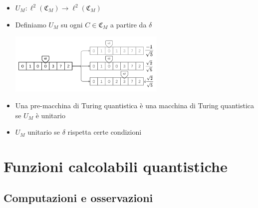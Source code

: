 \documentclass{beamer}
\newcommand{\conf}{\mathfrak{C}_{M}}
\newcommand{\hil}{\ell^{2}}
\begin{document}
\begin{frame}{\subsecname}{}
	\begin{itemize}
		\item<+-> \( U_{M} : \hil \left ( \conf \right ) \rightarrow \hil \left ( \conf \right ) \)
		\item<+-> Definiamo \( U_{M} \) su ogni \( C \in \conf \) a partire da \(\delta\) \par
		\centering\includegraphics[width=7.5cm]{transition2.png}
		\item<+-> Una pre-macchina di Turing quantistica è una \alert{macchina di Turing quantistica} se \( U_{M} \) è unitario
		\item<+-> \( U_{M} \) unitario se \(\delta\) rispetta certe condizioni
	\end{itemize}
\end{frame}

\section{Funzioni calcolabili quantistiche}

\subsection{Computazioni e osservazioni}
\end{document}
